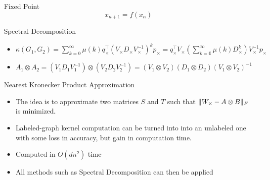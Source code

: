 \documentclass[compress]{beamer}
\DeclarePairedDelimiter{\norm}{\lVert}{\rVert}
\begin{document}
\begin{frame}{Fixed Point}
\begin{equation*}
x_{n+1} = f(x_n)
\end{equation*}
\end{frame}
\begin{frame}{Spectral Decomposition}
\begin{itemize}
	\item $\kappa(G_1,G_2)=\sum\limits_{k=0}^{\infty}\mu(k)q_{\times}^{\top}(V_{\times}D_{\times}V_{\times}^{-1})^{k}p_{\times} = q_{\times}^{\top}V_{\times}\left(\sum\limits_{k=0}^{\infty}\mu(k)D_{\times}^{k}\right)V_{\times}^{-1}p_{\times}$
	\item $A_1 \otimes A_2=(V_{1}D_{1}V_{1}^{-1})\otimes(V_{2}D_{2}V_{2}^{-1})=(V_1\otimes V_2)(D_1 \otimes D_2)(V_1 \otimes V_2)^{-1}$
\end{itemize}
\end{frame}
\begin{frame}{Nearest Kronecker Product Approximation}
\begin{itemize}
	\item The idea is to approximate two matrices $S$ and $T$ such that $\norm{W_\times - A\otimes B}_F$ is minimized.
	\item Labeled-graph kernel computation can be turned into into an unlabeled one with some loss in accuracy, but gain in computation time.
	\item Computed in $O(dn^2)$ time 
	\item All methods such as Spectral Decomposition can then be applied
\end{itemize}
\end{frame}
\end{document}
